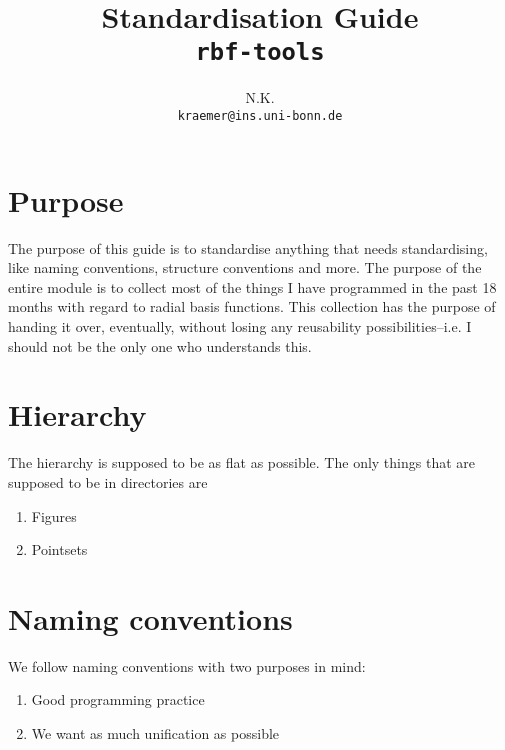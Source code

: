 \documentclass[11pt]{article}
\title{Standardisation Guide \\\texttt{rbf-tools}}
\author{N.K. \\ \texttt{kraemer@ins.uni-bonn.de}}
\begin{document}
\maketitle
\begin{figure}[h]
\centering
\begin{minipage}{0.5\textwidth}
\tableofcontents
\end{minipage}
\end{figure}




\section{Purpose}

The purpose of this guide is to standardise anything that needs standardising, like naming conventions, structure conventions and more. 
The purpose of the entire module is to collect most of the things I have programmed in the past 18 months with regard to radial basis functions. This collection has the purpose of handing it over, eventually, without losing any reusability possibilities--i.e. I should not be the only one who understands this.


\section{Hierarchy}
The hierarchy is supposed to be as flat as possible. The only things that are supposed to be in directories are 
\begin{enumerate}
\item Figures
\item Pointsets
\end{enumerate}


\section{Naming conventions}
We follow naming conventions with two purposes in mind:
\begin{enumerate}
\item Good programming practice
\item We want as much unification as possible
\end{enumerate}
\end{document}

